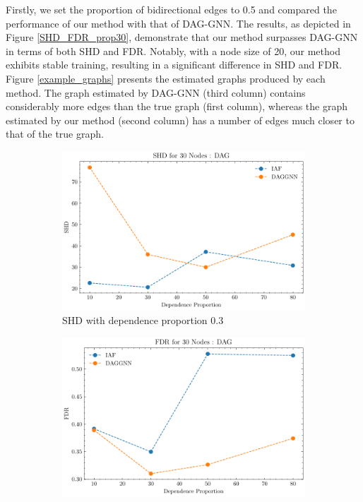 \documentclass[10pt]{article}
\begin{document}
Firstly, we set the proportion of bidirectional edges to 0.5 and compared the performance of our method with that of DAG-GNN. The results, as depicted in Figure \ref*{SHD_FDR_prop30}, demonstrate that our method surpasses DAG-GNN in terms of both SHD and FDR. Notably, with a node size of 20, our method exhibits stable training, resulting in a significant difference in SHD and FDR. Figure \ref*{example_graphs} presents the estimated graphs produced by each method. The graph estimated by DAG-GNN (third column) contains considerably more edges than the true graph (first column), whereas the graph estimated by our method (second column) has a number of edges much closer to that of the true graph.

\begin{figure}
    \centering
    \begin{subfigure}{0.45\textwidth}
        \includegraphics[width=\textwidth]{fig/SHD_dependence_30_DAG_threshold0.3.pdf}
        \caption{SHD with dependence proportion 0.3}
        \label{SHD_prop30}
    \end{subfigure}
    \hfill
    \begin{subfigure}{0.45\textwidth}
        \includegraphics[width=\textwidth]{fig/FDR_dependence_30_DAG_threshold0.3.pdf}

\end{subfigure}
\end{figure}
\end{document}
